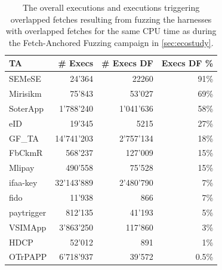\documentclass[conference]{IEEEtran} %
\newcommand{\stagetwo}{Fetch-Anchored Fuzzing\xspace} %
\newcommand{\eighteigthce}{Mlipay\xspace}
\newcommand{\aseventhreefour}{GF\_TA\xspace}
\newcommand{\sixfivefivea}{OTrPAPP\xspace}
\newcommand{\eightaaa}{Mirisikm\xspace}
\newcommand{\zeroeightzeroone}{ifaa-key\xspace}
\newcommand{\onefourbzero}{fido\xspace}
\newcommand{\dfonee}{paytrigger\xspace}
\newcommand{\fivethreefourfive}{SEMeSE\xspace}
\newcommand{\anineeightfive}{eID\xspace}
\newcommand{\foureightfourfour}{HDCP\xspace}
\newcommand{\foursixsixtwo}{FbCkmR\xspace}
\newcommand{\threesevensevene}{SoterApp\xspace}
\newcommand{\threedzeroeight}{VSIMApp\xspace}
\newcommand{\numexecseighteightce}{490'558\xspace}
\newcommand{\numexecsdfeighteightce}{75'528\xspace}
\newcommand{\numexecsdfperceighteightce}{15\%\xspace}
\newcommand{\numexecsaseventhreefour}{14'741'203\xspace}
\newcommand{\numexecsdfaseventhreefour}{2'757'134\xspace}
\newcommand{\numexecsdfpercaseventhreefour}{18\%\xspace}
\newcommand{\numexecssixfivefivea}{6'718'937\xspace}
\newcommand{\numexecsdfsixfivefivea}{39'572\xspace}
\newcommand{\numexecsdfpercsixfivefivea}{0.5\%\xspace}
\newcommand{\numexecseightaaa}{75'843\xspace}
\newcommand{\numexecsdfeightaaa}{53'027\xspace}
\newcommand{\numexecsdfperceightaaa}{69\%\xspace}
\newcommand{\numexecszeroeightzeroone}{32'143'889\xspace}
\newcommand{\numexecsdfzeroeightzeroone}{2'480'790\xspace}
\newcommand{\numexecsdfperczeroeightzeroone}{7\%\xspace}
\newcommand{\numexecsonefourbzero}{11'938\xspace}
\newcommand{\numexecsdfonefourbzero}{866\xspace}
\newcommand{\numexecsdfperconefourbzero}{7\%\xspace}
\newcommand{\numexecsdfonee}{812'135\xspace}
\newcommand{\numexecsdfdfonee}{41'193\xspace}
\newcommand{\numexecsdfpercdfonee}{5\%\xspace}
\newcommand{\numexecsfivethreefourfive}{24'364\xspace}
\newcommand{\numexecsdffivethreefourfive}{22260\xspace}
\newcommand{\numexecsdfpercfivethreefourfive}{91\%\xspace}
\newcommand{\numexecsanineeightfive}{19'345\xspace}
\newcommand{\numexecsdfanineeightfive}{5215\xspace}
\newcommand{\numexecsdfpercanineeightfive}{27\%\xspace}
\newcommand{\numexecsfoureightfourfour}{52'012\xspace}
\newcommand{\numexecsdffoureightfourfour}{891\xspace}
\newcommand{\numexecsdfpercfoureightfourfour}{1\%\xspace}
\newcommand{\numexecsthreedzeroeight}{3'863'250\xspace}
\newcommand{\numexecsdfthreedzeroeight}{117'860\xspace}
\newcommand{\numexecsdfpercthreedzeroeight}{3\%\xspace}
\newcommand{\numexecsfoursixsixtwo}{568'237\xspace}
\newcommand{\numexecsdffoursixsixtwo}{127'009\xspace}
\newcommand{\numexecsdfpercfoursixsixtwo}{15\%\xspace}
\newcommand{\numexecsthreesevensevene}{1'788'240\xspace}
\newcommand{\numexecsdfthreesevensevene}{1'041'636\xspace}
\newcommand{\numexecsdfpercthreesevensevene}{58\%\xspace}
\providecommand{\DIFaddbeginFL}{} %
\providecommand{\DIFaddendFL}{} %
\providecommand{\DIFdelbeginFL}{} %
\providecommand{\DIFdelendFL}{} %
\begin{document}
\begin{table}[t]
    \footnotesize
    \centering
    \begin{tabular}{lrrr}
        \toprule
        TA&
        \# Execs &
        \# Execs DF &
        Execs DF \%\\
        \toprule
        \fivethreefourfive & \numexecsfivethreefourfive &\numexecsdffivethreefourfive  & \numexecsdfpercfivethreefourfive\\
        \eightaaa & \numexecseightaaa &\numexecsdfeightaaa  & \numexecsdfperceightaaa\\
        \threesevensevene & \numexecsthreesevensevene &\numexecsdfthreesevensevene  &\numexecsdfpercthreesevensevene\\
        \anineeightfive & \numexecsanineeightfive &\numexecsdfanineeightfive  &\numexecsdfpercanineeightfive\\
        \aseventhreefour & \numexecsaseventhreefour &\numexecsdfaseventhreefour  &\numexecsdfpercaseventhreefour\\
        \foursixsixtwo & \numexecsfoursixsixtwo &\numexecsdffoursixsixtwo  &\numexecsdfpercfoursixsixtwo\\
        \eighteigthce & \numexecseighteightce  & \numexecsdfeighteightce &\numexecsdfperceighteightce\\
        \zeroeightzeroone & \numexecszeroeightzeroone &\numexecsdfzeroeightzeroone  &\numexecsdfperczeroeightzeroone\\
        \onefourbzero & \numexecsonefourbzero &\numexecsdfonefourbzero  &\numexecsdfperconefourbzero\\
        \dfonee & \numexecsdfonee &\numexecsdfdfonee  &\numexecsdfpercdfonee\\
        \threedzeroeight & \numexecsthreedzeroeight  & \numexecsdfthreedzeroeight &\numexecsdfpercthreedzeroeight\\
        \foureightfourfour & \numexecsfoureightfourfour &\numexecsdffoureightfourfour  &\numexecsdfpercfoureightfourfour\\
        \sixfivefivea & \numexecssixfivefivea &\numexecsdfsixfivefivea  &\numexecsdfpercsixfivefivea\\

        \bottomrule
    \end{tabular}
    \caption{
        The overall executions and executions triggering overlapped fetches resulting from fuzzing the harnesses with overlapped 
        fetches for the same CPU time as during the \stagetwo campaign in \DIFdelbeginFL %
\DIFdelendFL \DIFaddbeginFL \autoref{sec:ecostudy}\DIFaddendFL . 
    }
    \label{tab:reshape}
\end{table}
\end{document}
